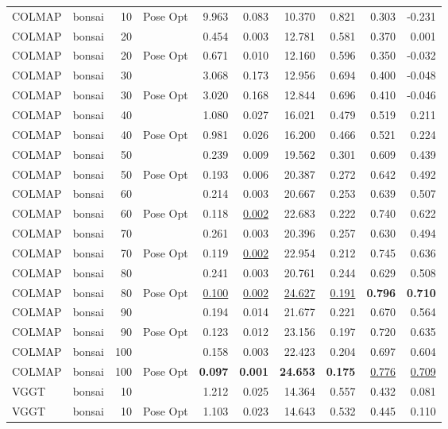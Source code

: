 \begin{table}[H]
\begin{tabular}{llrlrrrrrr}
COLMAP & bonsai & 10 & Pose Opt & 9.963 & 0.083 & 10.370 & 0.821 & 0.303 & -0.231 \\
COLMAP & bonsai & 20 &  & 0.454 & 0.003 & 12.781 & 0.581 & 0.370 & 0.001 \\
COLMAP & bonsai & 20 & Pose Opt & 0.671 & 0.010 & 12.160 & 0.596 & 0.350 & -0.032 \\
COLMAP & bonsai & 30 &  & 3.068 & 0.173 & 12.956 & 0.694 & 0.400 & -0.048 \\
COLMAP & bonsai & 30 & Pose Opt & 3.020 & 0.168 & 12.844 & 0.696 & 0.410 & -0.046 \\
COLMAP & bonsai & 40 &  & 1.080 & 0.027 & 16.021 & 0.479 & 0.519 & 0.211 \\
COLMAP & bonsai & 40 & Pose Opt & 0.981 & 0.026 & 16.200 & 0.466 & 0.521 & 0.224 \\
COLMAP & bonsai & 50 &  & 0.239 & 0.009 & 19.562 & 0.301 & 0.609 & 0.439 \\
COLMAP & bonsai & 50 & Pose Opt & 0.193 & 0.006 & 20.387 & 0.272 & 0.642 & 0.492 \\
COLMAP & bonsai & 60 &  & 0.214 & 0.003 & 20.667 & 0.253 & 0.639 & 0.507 \\
COLMAP & bonsai & 60 & Pose Opt & 0.118 & \underline{0.002} & 22.683 & 0.222 & 0.740 & 0.622 \\
COLMAP & bonsai & 70 &  & 0.261 & 0.003 & 20.396 & 0.257 & 0.630 & 0.494 \\
COLMAP & bonsai & 70 & Pose Opt & 0.119 & \underline{0.002} & 22.954 & 0.212 & 0.745 & 0.636 \\
COLMAP & bonsai & 80 &  & 0.241 & 0.003 & 20.761 & 0.244 & 0.629 & 0.508 \\
COLMAP & bonsai & 80 & Pose Opt & \underline{0.100} & \underline{0.002} & \underline{24.627} & \underline{0.191} & \textbf{0.796} & \textbf{0.710} \\
COLMAP & bonsai & 90 &  & 0.194 & 0.014 & 21.677 & 0.221 & 0.670 & 0.564 \\
COLMAP & bonsai & 90 & Pose Opt & 0.123 & 0.012 & 23.156 & 0.197 & 0.720 & 0.635 \\
COLMAP & bonsai & 100 &  & 0.158 & 0.003 & 22.423 & 0.204 & 0.697 & 0.604 \\
COLMAP & bonsai & 100 & Pose Opt & \textbf{0.097} & \textbf{0.001} & \textbf{24.653} & \textbf{0.175} & \underline{0.776} & \underline{0.709} \\
VGGT & bonsai & 10 &  & 1.212 & 0.025 & 14.364 & 0.557 & 0.432 & 0.081 \\
VGGT & bonsai & 10 & Pose Opt & 1.103 & 0.023 & 14.643 & 0.532 & 0.445 & 0.110 \\

\end{tabular}
\end{table}
